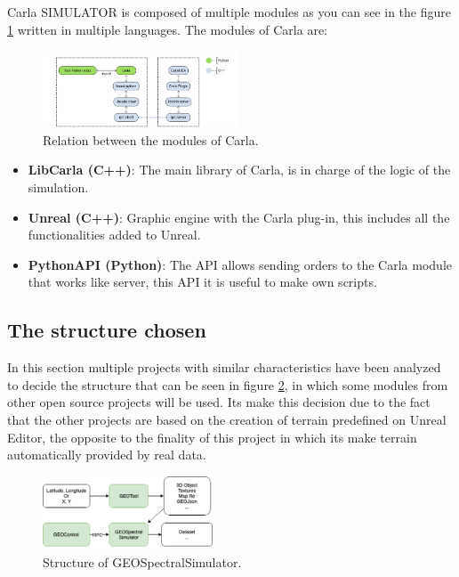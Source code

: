 \documentclass[10pt,a4paper,twocolumn,twoside]{article}
\begin{document}
Carla SIMULATOR is composed of multiple modules as you can see in the figure \ref{fig-carlamodules} written in multiple languages. The modules of Carla are:

\begin{figure}[!h]
  	\includegraphics[width=0.52\textwidth]{carlamodules}
	\caption{Relation between the modules of Carla.}
	\label{fig-carlamodules}
\end{figure}

\begin{itemize}
\setlength\itemsep{0em}
 \item \textbf{LibCarla (C++)}: The main library of Carla, is in charge of the logic of the simulation.
 \item \textbf{Unreal (C++)}: Graphic engine with the Carla plug-in, this includes all the functionalities added to Unreal.
 \item \textbf{PythonAPI (Python)}: The API allows sending orders to the Carla module that works like server, this API it is useful to make own scripts.
\end{itemize}


\subsection{The structure chosen}

In this section multiple projects with similar characteristics have been analyzed to decide the structure that can be seen in figure \ref{fig-dronsimulatormodules}, in which some modules from other open source projects will be used. Its make this decision due to the fact that the other projects are based on the creation of terrain predefined on Unreal Editor, the opposite to the finality of this project in which its make terrain automatically provided by real data.

\begin{figure}[!h]
\centering
  	\includegraphics[width=0.45\textwidth]{structuretfg}
	\caption{Structure of GEOSpectralSimulator.}
	\label{fig-dronsimulatormodules}
\end{figure}
\end{document}
